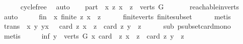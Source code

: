 \begin{isabellebody}
\ \ \ \ \isamarkupfalse%
\ cycle{\isacharunderscore}{\kern0pt}free\ \isamarkupfalse%
\ auto\isanewline
\ \ \isamarkupfalse%
\ part{\isacharcolon}{\kern0pt}\ {\isachardoublequoteopen}{\isasymforall}\ x{\isachardot}{\kern0pt}\ {\isacharbraceleft}{\kern0pt}z{\isachardot}{\kern0pt}\ x\ {\isasymrightarrow}\isactrlsup {\isacharplus}{\kern0pt}\ z{\isacharbraceright}{\kern0pt}\ {\isasymsubseteq}\ verts\ G{\isachardoublequoteclose}\ \isanewline
\ \ \ \ \isamarkupfalse%
\ reachable{}{\isacharunderscore}{\kern0pt}in{\isacharunderscore}{\kern0pt}verts\ \ \isamarkupfalse%
\ auto\isanewline
\ \ \isamarkupfalse%
\ \isamarkupfalse%
\ fin{\isacharcolon}{\kern0pt}\ {\isachardoublequoteopen}{\isasymforall}\ x{\isachardot}{\kern0pt}\ finite\ {\isacharbraceleft}{\kern0pt}z{\isachardot}{\kern0pt}\ x\ {\isasymrightarrow}\isactrlsup {\isacharplus}{\kern0pt}\ z{\isacharbraceright}{\kern0pt}{\isachardoublequoteclose}\isanewline
\ \ \ \ \isamarkupfalse%
\ finite{\isacharunderscore}{\kern0pt}verts\ finite{\isacharunderscore}{\kern0pt}subset\isanewline
\ \ \ \ \isamarkupfalse%
\ metis\ \isanewline
\ \ \isamarkupfalse%
\ \isamarkupfalse%
\ trans{\isacharcolon}{\kern0pt}\ {\isachardoublequoteopen}{\isasymforall}\ x\ y{\isachardot}{\kern0pt}\ y{\isasymrightarrow}\isactrlsup {\isacharplus}{\kern0pt}x\ {\isasymlongrightarrow}\ \ card\ {\isacharbraceleft}{\kern0pt}z{\isachardot}{\kern0pt}\ x\ {\isasymrightarrow}\isactrlsup {\isacharplus}{\kern0pt}\ z{\isacharbraceright}{\kern0pt}\ {\isacharless}{\kern0pt}\ card\ {\isacharbraceleft}{\kern0pt}z{\isachardot}{\kern0pt}\ y\ {\isasymrightarrow}\isactrlsup {\isacharplus}{\kern0pt}\ z{\isacharbraceright}{\kern0pt}{\isachardoublequoteclose}\isanewline
\ \ \ \ \isamarkupfalse%
\ sub\ psubset{\isacharunderscore}{\kern0pt}card{\isacharunderscore}{\kern0pt}mono\ \isamarkupfalse%
\ metis\isanewline
\ \ \isamarkupfalse%
\ \isamarkupfalse%
\ inf{\isacharcolon}{\kern0pt}\ {\isachardoublequoteopen}{\isasymforall}y\ {\isasymin}\ verts\ G{\isachardot}{\kern0pt}\ {\isasymexists}x{\isachardot}{\kern0pt}\ card\ \ {\isacharbraceleft}{\kern0pt}z{\isachardot}{\kern0pt}\ x\ {\isasymrightarrow}\isactrlsup {\isacharplus}{\kern0pt}\ z{\isacharbraceright}{\kern0pt}\ {\isachargreater}{\kern0pt}\ card\ {\isacharbraceleft}{\kern0pt}z{\isachardot}{\kern0pt}\ y\ {\isasymrightarrow}\isactrlsup {\isacharplus}{\kern0pt}\ z{\isacharbraceright}{\kern0pt}{\isachardoublequoteclose}\isanewline

\end{isabellebody}
